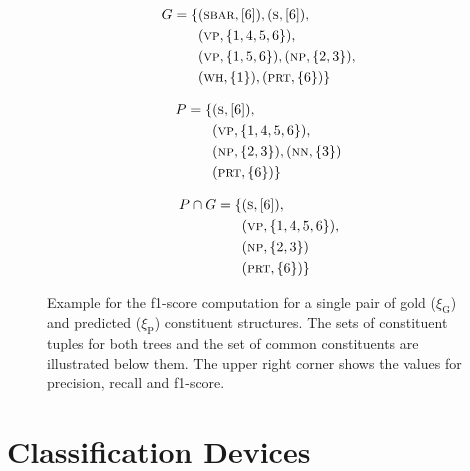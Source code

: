 \documentclass[../document.tex]{subfiles}
\begin{document}
\begin{figure}
        \begin{minipage}{.3\linewidth}
            \small
            \begin{align*}
                G = \{
                    &(\textsc{sbar}, [6]),
                     (\textsc{s}, [6]), \\
                    &(\textsc{vp}, \{1,4,5,6\}),\\
                    &(\textsc{vp}, \{1,5,6\}),
                     (\textsc{np}, \{2,3\}), \\
                    &(\textsc{wh}, \{1\}),
                     (\textsc{prt}, \{6\}) \}
             \end{align*}
         \end{minipage}
        \hfill
         \begin{minipage}{.3\linewidth}
             \small
             \begin{align*}
                P = \{
                    &(\textsc{s}, [6]), \\
                    &(\textsc{vp}, \{1,4,5,6\}),\\
                    &(\textsc{np}, \{2,3\}),
                     (\textsc{nn}, \{3\}) \\
                    &(\textsc{prt}, \{6\}) \}
            \end{align*}
        \end{minipage}
        \hfill
        \begin{minipage}{.3\linewidth}
            \small
            \begin{align*}
                P \cap G = \{
                &(\textsc{s}, [6]), \\
                &(\textsc{vp}, \{1,4,5,6\}),\\
                &(\textsc{np}, \{2,3\}) \\
                &(\textsc{prt}, \{6\}) \}
            \end{align*}
        \end{minipage}

        \caption{
            Example for the f1-score computation for a single pair of gold (\(\xi_\text{G}\)) and predicted (\(\xi_\text{P}\)) constituent structures.
            The sets of constituent tuples for both trees and the set of common constituents are illustrated below them.
            The upper right corner shows the values for precision, recall and f1-score.
        }
    \end{figure}

    \section{Classification Devices}


    \ifSubfilesClassLoaded{%
        \printglossaries
    }{}
\end{document}
